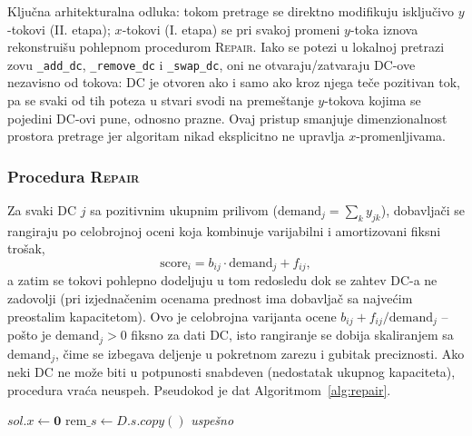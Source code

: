 \documentclass[12pt,a4paper]{article}
\begin{document}
Ključna arhitekturalna odluka: tokom pretrage se direktno modifikuju
isključivo $y$-tokovi (II. etapa); $x$-tokovi (I. etapa) se pri svakoj promeni
$y$-toka iznova rekonstruišu pohlepnom procedurom \textsc{Repair}. Iako se
potezi u lokalnoj pretrazi zovu \texttt{\_add\_dc}, \texttt{\_remove\_dc} i
\texttt{\_swap\_dc}, oni ne otvaraju/zatvaraju DC-ove nezavisno od tokova: DC
je otvoren ako i samo ako kroz njega teče pozitivan tok, pa se svaki od tih
poteza u stvari svodi na premeštanje $y$-tokova kojima se pojedini DC-ovi
pune, odnosno prazne. Ovaj pristup smanjuje dimenzionalnost prostora pretrage
jer algoritam nikad eksplicitno ne upravlja $x$-promenljivama.

\subsubsection{Procedura \textsc{Repair}}

Za svaki DC $j$ sa pozitivnim ukupnim prilivom ($\text{demand}_j =
\sum_k y_{jk}$), dobavljači se rangiraju po celobrojnoj oceni koja kombinuje
varijabilni i amortizovani fiksni trošak,
\begin{equation} \label{eq:score}
\text{score}_i = b_{ij}\cdot\text{demand}_j + f_{ij},
\end{equation}
a zatim se tokovi pohlepno dodeljuju u tom redosledu dok se zahtev DC-a ne
zadovolji (pri izjednačenim ocenama prednost ima dobavljač sa najvećim
preostalim kapacitetom). Ovo je celobrojna varijanta ocene
$b_{ij} + f_{ij}/\text{demand}_j$ -- pošto je $\text{demand}_j > 0$ fiksno za
dati DC, isto rangiranje se dobija skaliranjem sa $\text{demand}_j$, čime se
izbegava deljenje u pokretnom zarezu i gubitak preciznosti. Ako neki DC ne
može biti u potpunosti snabdeven (nedostatak ukupnog kapaciteta), procedura
vraća neuspeh. Pseudokod je dat Algoritmom~\ref{alg:repair}.

\begin{algorithm}[H]
\caption{Repair$(sol, D)$}
\label{alg:repair}
\SetAlgoLined
$sol.x \leftarrow \mathbf{0}$\;
$\text{rem}\_s \leftarrow D.s.copy()$\;
\Return \textit{uspešno}
\end{algorithm}
\end{document}
